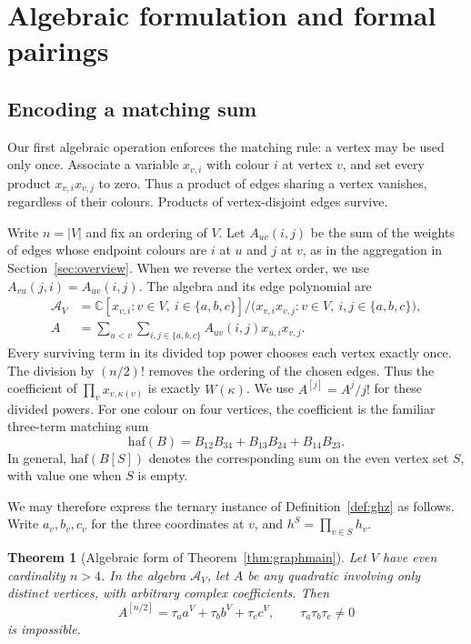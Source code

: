 \documentclass[11pt]{article}
\newtheorem{theorem}{Theorem}[section]
\theoremstyle{definition}
\theoremstyle{plain}
\numberwithin{equation}{section}
\begin{document}
\section{Algebraic formulation and formal pairings}\label{sec:model}

\subsection{Encoding a matching sum}

Our first algebraic operation enforces the matching rule: a vertex may be
used only once. Associate a variable \(x_{v,i}\) with colour \(i\) at
vertex \(v\), and set every product \(x_{v,i}x_{v,j}\) to zero. Thus a
product of edges sharing a vertex vanishes, regardless of their colours.
Products of vertex-disjoint edges survive.

Write \(n=|V|\) and fix an ordering of \(V\).
Let \(A_{uv}(i,j)\) be the sum of the weights of edges whose endpoint colours
are \(i\) at \(u\) and \(j\) at \(v\), as in the aggregation in
Section~\ref{sec:overview}. When we reverse the vertex order, we use
\(A_{vu}(j,i)=A_{uv}(i,j)\). The algebra and its edge polynomial are
\[
 \begin{aligned}
 \mathcal A_V&=\mathbb C[x_{v,i}:v\in V,\ i\in\{a,b,c\}]
       \big/\bigl(x_{v,i}x_{v,j}:v\in V,\ i,j\in\{a,b,c\}\bigr),\\
 A&=\sum_{u<v}\sum_{i,j\in\{a,b,c\}}A_{uv}(i,j)x_{u,i}x_{v,j}.
 \end{aligned}
\]
Every surviving term in its divided top power chooses each vertex exactly once.
The division by \((n/2)!\) removes the ordering of the chosen edges. Thus the
coefficient of \(\prod_v x_{v,\kappa(v)}\) is exactly \(W(\kappa)\).
We use \(A^{[j]}=A^j/j!\) for these divided powers. For one colour on four
vertices, the coefficient is the familiar three-term matching sum
\[
 \mathrm{haf}(B)=B_{12}B_{34}+B_{13}B_{24}+B_{14}B_{23}.
\]
In general, \(\mathrm{haf}(B[S])\) denotes the corresponding sum on the
even vertex set \(S\), with value one when \(S\) is empty.

We may therefore express the ternary instance of
Definition~\ref{def:ghz} as follows. Write \(a_v,b_v,c_v\) for the three
coordinates at \(v\), and \(h^S=\prod_{v\in S}h_v\).

\begin{theorem}[Algebraic form of Theorem~\ref{thm:graphmain}]\label{thm:main}
Let \(V\) have even cardinality \(n>4\). In the algebra \(\mathcal A_V\),
let \(A\) be any quadratic involving only distinct vertices, with arbitrary
complex coefficients. Then
\begin{equation}
 A^{[n/2]}=\tau_a a^V+\tau_b b^V+\tau_c c^V,
 \qquad \tau_a\tau_b\tau_c\ne0
 \tag{1}\label{eq:target}
\end{equation}
is impossible.
\end{theorem}
\end{document}
